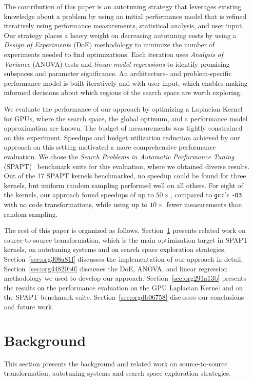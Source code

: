 \documentclass[conference]{IEEEtran}
\begin{document}
The contribution of this paper is an autotuning strategy that leverages existing
knowledge about a problem by using  an initial performance model that is refined
iteratively  using  performance  measurements, statistical  analysis,  and  user
input. Our  strategy places  a heavy  weight on  decreasing autotuning  costs by
using  a \emph{Design  of  Experiments} (DoE)  methodology to  minimize  the number  of
experiments  needed  to find  optimizations.  Each  iteration uses  \emph{Analysis  of
Variance}  (ANOVA)  tests and  \emph{linear  model  regressions} to  identify  promising
subspaces  and parameter  significance.  An  architecture- and  problem-specific
performance model is built iteratively and with user input, which enables making
informed decisions about which regions of the search space are worth exploring.

We evaluate the performance of our approach by optimizing a Laplacian Kernel for
GPUs,  where the  search  space, the  global optimum,  and  a performance  model
approximation are known.  The budget of measurements was  tightly constrained on
this  experiment. Speedups  and  budget utilization  reduction  achieved by  our
approach on this setting motivated  a more comprehensive performance evaluation.
We    chose   the    \emph{Search   Problems    in   Automatic    Performance   Tuning}
(SPAPT)~\cite{balaprakash2012spapt} benchmark  suite for this  evaluation, where
we obtained diverse results. Out of the 17 SPAPT kernels benchmarked, no speedup
could be found for three kernels,  but uniform random sampling performed well on
all others.  For eight  of the  kernels, our  approach found  speedups of  up to
\(50\times\), compared  to \texttt{gcc}'s \texttt{-O3}  with no code  transformations, while using  up to
\(10\times\) fewer measurements than random sampling.

The  rest of  this paper  is organized  as follows.  Section~\ref{sec:orgd936da6} presents
related work on source-to-source transformation,  which is the main optimization
target in SPAPT  kernels, on autotuning systems and on  search space exploration
strategies.  Section~\ref{sec:org308a81f}   discusses  the
implementation  of  our  approach   in  detail.  Section~\ref{sec:org44820b0}
discusses the DoE,  ANOVA, and linear regression methodology we  used to develop
our  approach.  Section~\ref{sec:org291a13b}  presents  the  results  on  the
performance evaluation  on the GPU Laplacian  Kernel and on the  SPAPT benchmark
suite. Section~\ref{sec:orgdb06758} discusses our conclusions and future work.
\section{Background}
\label{sec:orgd936da6}
This  section  presents the  background  and  related work  on  source-to-source
transformation, autotuning systems and search space exploration strategies.
\end{document}
